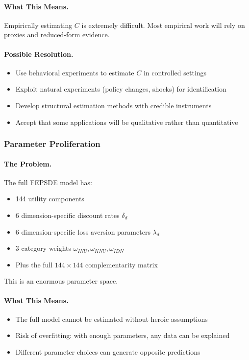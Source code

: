 \documentclass[12pt,a4paper]{article}
\begin{document}
\paragraph{What This Means.}
Empirically estimating $C$ is extremely difficult.
Most empirical work will rely on proxies and reduced-form evidence.

\paragraph{Possible Resolution.}
\begin{itemize}
  \item Use behavioral experiments to estimate $C$ in controlled settings
  \item Exploit natural experiments (policy changes, shocks) for identification
  \item Develop structural estimation methods with credible instruments
  \item Accept that some applications will be qualitative rather than quantitative
\end{itemize}

\subsubsection{Parameter Proliferation}

\paragraph{The Problem.}
The full FEPSDE model has:
\begin{itemize}
  \item 144 utility components
  \item 6 dimension-specific discount rates $\delta_d$
  \item 6 dimension-specific loss aversion parameters $\lambda_d$
  \item 3 category weights $\omega_{INU}, \omega_{KNU}, \omega_{IDN}$
  \item Plus the full $144 \times 144$ complementarity matrix
\end{itemize}

This is an enormous parameter space.

\paragraph{What This Means.}
\begin{itemize}
  \item The full model cannot be estimated without heroic assumptions
  \item Risk of overfitting: with enough parameters, any data can be explained
  \item Different parameter choices can generate opposite predictions
\end{itemize}
\end{document}
